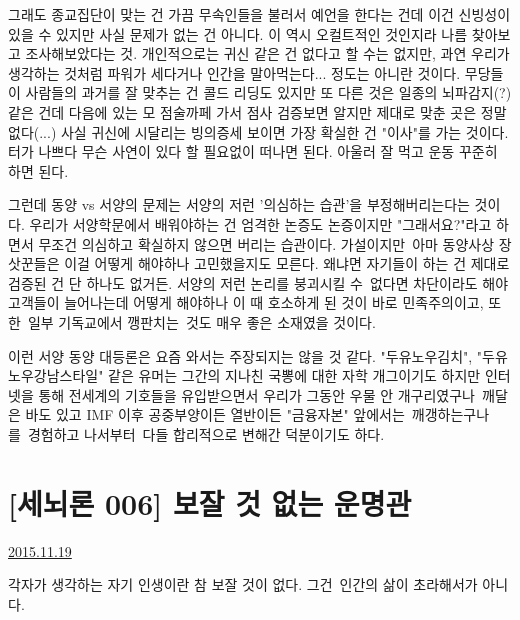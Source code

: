 \begin{enumerate}
그래도 종교집단이 맞는 건 가끔 무속인들을 불러서 예언을 한다는 건데 이건 신빙성이 있을 수 있지만 사실 문제가 없는 건 아니다.
이 역시 오컬트적인 것인지라 나름 찾아보고 조사해보았다는 것.
개인적으로는 귀신 같은 건 없다고 할 수는 없지만, 과연 우리가 생각하는 것처럼 파워가 세다거나 인간을 말아먹는다... 정도는 아니란 것이다.
무당들이 사람들의 과거를 잘 맞추는 건 콜드 리딩도 있지만 또 다른 것은 일종의 뇌파감지(?) 같은 건데
다음에 있는 모 점술까페 가서 점사 검증보면 알지만 제대로 맞춘 곳은 정말 없다(...)
사실 귀신에 시달리는 빙의증세 보이면 가장 확실한 건 "이사"를 가는 것이다. 터가 나쁘다 무슨 사연이 있다 할 필요없이 떠나면 된다.
아울러 잘 먹고 운동 꾸준히 하면 된다.
\vspace{5mm}

그런데 동양 vs 서양의 문제는 서양의 저런 '의심하는 습관'을 부정해버리는다는 것이다.
우리가 서양학문에서 배워야하는 건 엄격한 논증도 논증이지만 "그래서요?"라고 하면서 무조건 의심하고 확실하지 않으면 버리는 습관이다.
가설이지만 아마 동양사상 장삿꾼들은 이걸 어떻게 해야하나 고민했을지도 모른다.
왜냐면 자기들이 하는 건 제대로 검증된 건 단 하나도 없거든.
서양의 저런 논리를 붕괴시킬 수 없다면 차단이라도 해야 고객들이 늘어나는데 어떻게 해야하나
이 때 호소하게 된 것이 바로 민족주의이고, 또한 일부 기독교에서 깽판치는 것도 매우 좋은 소재였을 것이다.
\vspace{5mm}

이런 서양 동양 대등론은 요즘 와서는 주장되지는 않을 것 같다.
"두유노우김치", "두유노우강남스타일" 같은 유머는 그간의 지나친 국뽕에 대한 자학 개그이기도 하지만
인터넷을 통해 전세계의 기호들을 유입받으면서 우리가 그동안 우물 안 개구리였구나 깨달은 바도 있고
IMF 이후 공중부양이든 열반이든 "금융자본" 앞에서는 깨갱하는구나를 경험하고 나서부터 다들 합리적으로 변해간 덕분이기도 하다.
\vspace{5mm}

\end{enumerate}






\section{[세뇌론 006] 보잘 것 없는 운명관}
\href{https://www.kockoc.com/Apoc/500505}{2015.11.19}

\vspace{5mm}

각자가 생각하는 자기 인생이란 참 보잘 것이 없다.
그건 인간의 삶이 초라해서가 아니다.
\vspace{5mm}

